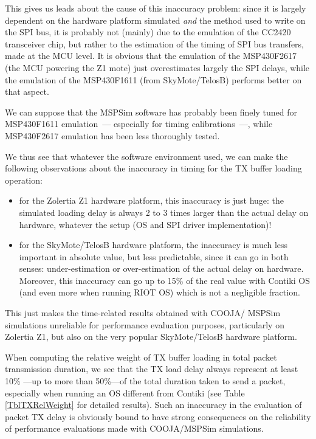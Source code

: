 \documentclass[10pt]{ewsn-proc}
\begin{document}
This gives us leads about the cause of this inaccuracy problem: since it
is largely dependent on the hardware platform simulated \emph{and} the method
used to write on the SPI bus, it is probably not (mainly) due to the
emulation of the CC2420 transceiver chip, but rather to the estimation of
the timing of SPI bus transfers, made at the MCU level. It is obvious that
the emulation of the MSP430F2617 (the MCU powering the Z1 mote) just
overestimates largely the SPI delays, while the emulation of the MSP430F1611
(from SkyMote/TelosB) performs better on that aspect.

We can suppose that the MSPSim software has probably been finely tuned for
MSP430F1611 emulation~--- especially for timing calibrations~---, while
MSP430F2617 emulation has been less thoroughly tested.

\medskip

We thus see that whatever the software environment used, we can make the
following observations about the inaccuracy in timing for the TX buffer
loading operation:
\begin{itemize}
\item for the Zolertia Z1 hardware platform, this inaccuracy is just huge:
the simulated loading delay is always 2 to 3 times larger than the actual
delay on hardware, whatever the setup (OS and SPI driver implementation)!
\item for the SkyMote/TelosB hardware platform, the inaccuracy is much less
important in absolute value, but less predictable, since it can go in both
senses: under-estimation or over-estimation of the actual delay on hardware.
Moreover, this inaccuracy can go up to 15\% of the real value with Contiki
OS (and even more when running RIOT OS) which is not a negligible fraction.
\end{itemize}
This just makes the time-related results obtained with COOJA/ MSPSim
simulations unreliable for performance evaluation purposes, particularly
on Zolertia Z1, but also on the very popular SkyMote/TelosB hardware platform.

\medskip

When computing the relative weight of TX buffer loading in total packet
transmission duration, we see that the TX load delay always represent at
least 10\% ---up to more than 50\%---of the total duration taken to send
a packet, especially when running an OS different from Contiki (see Table
\ref{TblTXRelWeight} for detailed results).
Such an inaccuracy in the evaluation of packet TX delay is obviously bound
to have strong consequences on the reliability of performance evaluations
made with COOJA/MSPSim simulations.
\end{document}
